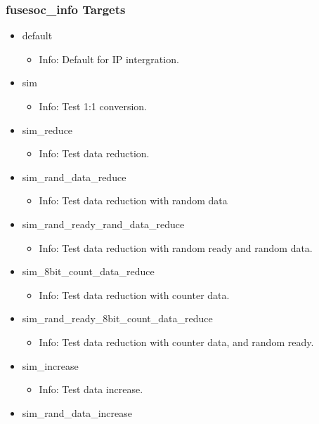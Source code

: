 \subsubsection{fusesoc\_info Targets}
\begin{itemize}
\item default
	\begin{itemize}
	\item[$\space$] Info: Default for IP intergration.
	\end{itemize}
\item sim
	\begin{itemize}
	\item[$\space$] Info: Test 1:1 conversion.
	\end{itemize}
\item sim\_reduce
	\begin{itemize}
	\item[$\space$] Info: Test data reduction.
	\end{itemize}
\item sim\_rand\_data\_reduce
	\begin{itemize}
	\item[$\space$] Info: Test data reduction with random data
	\end{itemize}
\item sim\_rand\_ready\_rand\_data\_reduce
	\begin{itemize}
	\item[$\space$] Info: Test data reduction with random ready and random data.
	\end{itemize}
\item sim\_8bit\_count\_data\_reduce
	\begin{itemize}
	\item[$\space$] Info: Test data reduction with counter data.
	\end{itemize}
\item sim\_rand\_ready\_8bit\_count\_data\_reduce
	\begin{itemize}
	\item[$\space$] Info: Test data reduction with counter data, and random ready.
	\end{itemize}
\item sim\_increase
	\begin{itemize}
	\item[$\space$] Info: Test data increase.
	\end{itemize}
\item sim\_rand\_data\_increase
	\begin{itemize}

\end{itemize}
\end{itemize}
